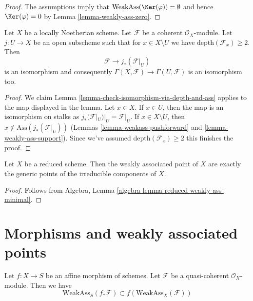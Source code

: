 \begin{proof}
The assumptions imply that $\text{WeakAss}(\Ker(\varphi)) = \emptyset$
and hence $\Ker(\varphi) = 0$ by Lemma \ref{lemma-weakly-ass-zero}.
\end{proof}

\begin{lemma}
\label{lemma-depth-2-hartog}
Let $X$ be a locally Noetherian scheme. Let $\mathcal{F}$
be a coherent $\mathcal{O}_X$-module. Let $j : U \to X$
be an open subscheme such that for $x \in X \setminus U$
we have $\text{depth}(\mathcal{F}_x) \geq 2$. Then
$$
\mathcal{F} \longrightarrow j_*(\mathcal{F}|_U)
$$
is an isomorphism and consequently
$\Gamma(X, \mathcal{F}) \to \Gamma(U, \mathcal{F})$
is an isomorphism too.
\end{lemma}

\begin{proof}
We claim Lemma \ref{lemma-check-isomorphism-via-depth-and-ass}
applies to the map displayed in the lemma.
Let $x \in X$. If $x \in U$, then the map is an
isomorphism on stalks as $j_*(\mathcal{F}|_U)|_U = \mathcal{F}|_U$.
If $x \in X \setminus U$, then $x \not \in \text{Ass}(j_*(\mathcal{F}|_U))$
(Lemmas \ref{lemma-weakass-pushforward} and \ref{lemma-weakly-ass-support}).
Since we've assumed $\text{depth}(\mathcal{F}_x) \geq 2$
this finishes the proof.
\end{proof}

\begin{lemma}
\label{lemma-weakass-reduced}
Let $X$ be a reduced scheme. Then the weakly associated point of $X$
are exactly the generic points of the irreducible components of $X$.
\end{lemma}

\begin{proof}
Follows from Algebra, Lemma \ref{algebra-lemma-reduced-weakly-ass-minimal}.
\end{proof}



\section{Morphisms and weakly associated points}
\label{section-morphisms-weakly-associated}

\begin{lemma}
\label{lemma-weakly-ass-reverse-functorial}
Let $f : X \to S$ be an affine morphism of schemes.
Let $\mathcal{F}$ be a quasi-coherent $\mathcal{O}_X$-module.
Then we have
$$
\text{WeakAss}_S(f_*\mathcal{F}) \subset f(\text{WeakAss}_X(\mathcal{F}))
$$
\end{lemma}

